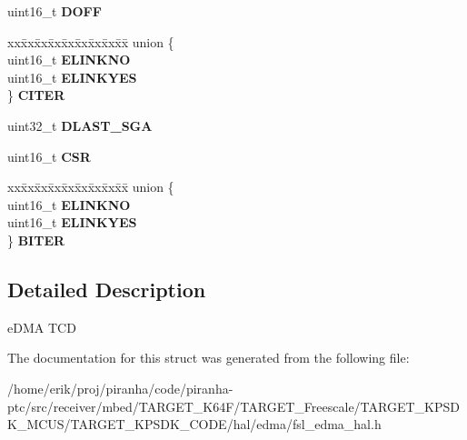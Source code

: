 \begin{DoxyCompactItemize}
\item 
uint16\+\_\+t {\bfseries D\+O\+FF}\hypertarget{structEDMASoftwareTcd_a7cd6da1e5c86853a6db095d51477b2b8}{}\label{structEDMASoftwareTcd_a7cd6da1e5c86853a6db095d51477b2b8}

\item 
\begin{tabbing}
xx\=xx\=xx\=xx\=xx\=xx\=xx\=xx\=xx\=\kill
union \{\\
\>uint16\_t {\bfseries ELINKNO}\\
\>uint16\_t {\bfseries ELINKYES}\\
\} {\bfseries CITER}\hypertarget{structEDMASoftwareTcd_a844890b456904566f6e1327136a050ca}{}\label{structEDMASoftwareTcd_a844890b456904566f6e1327136a050ca}
\\

\end{tabbing}\item 
uint32\+\_\+t {\bfseries D\+L\+A\+S\+T\+\_\+\+S\+GA}\hypertarget{structEDMASoftwareTcd_a7c93fdf413123b3c9ae0537004637bea}{}\label{structEDMASoftwareTcd_a7c93fdf413123b3c9ae0537004637bea}

\item 
uint16\+\_\+t {\bfseries C\+SR}\hypertarget{structEDMASoftwareTcd_aca8093f01bcf0bfca70e95d4a75c8388}{}\label{structEDMASoftwareTcd_aca8093f01bcf0bfca70e95d4a75c8388}

\item 
\begin{tabbing}
xx\=xx\=xx\=xx\=xx\=xx\=xx\=xx\=xx\=\kill
union \{\\
\>uint16\_t {\bfseries ELINKNO}\\
\>uint16\_t {\bfseries ELINKYES}\\
\} {\bfseries BITER}\hypertarget{structEDMASoftwareTcd_a4d40fe8bfbe9439c54a9e644df07b859}{}\label{structEDMASoftwareTcd_a4d40fe8bfbe9439c54a9e644df07b859}
\\

\end{tabbing}\end{DoxyCompactItemize}


\subsection{Detailed Description}
e\+D\+MA T\+CD 

The documentation for this struct was generated from the following file\+:\begin{DoxyCompactItemize}
\item 
/home/erik/proj/piranha/code/piranha-\/ptc/src/receiver/mbed/\+T\+A\+R\+G\+E\+T\+\_\+\+K64\+F/\+T\+A\+R\+G\+E\+T\+\_\+\+Freescale/\+T\+A\+R\+G\+E\+T\+\_\+\+K\+P\+S\+D\+K\+\_\+\+M\+C\+U\+S/\+T\+A\+R\+G\+E\+T\+\_\+\+K\+P\+S\+D\+K\+\_\+\+C\+O\+D\+E/hal/edma/fsl\+\_\+edma\+\_\+hal.\+h\end{DoxyCompactItemize}
